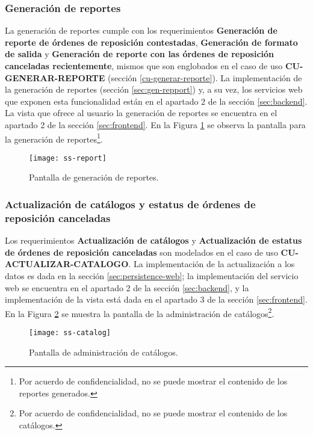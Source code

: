 \subsubsection{Generación de reportes}
La generación de reportes cumple con los requerimientos \textbf{Generación de reporte de órdenes de reposición contestadas}, \textbf{Generación de formato de salida} y \textbf{Generación de reporte con las órdenes de reposición canceladas recientemente}, mismos que son englobados en el caso de uso \textbf{CU-GENERAR-REPORTE} (sección \ref{cu-generar-reporte}). La implementación de la generación de reportes (sección \ref{sec:gen-repport}) y, a su vez, los servicios web que exponen esta funcionalidad están en el apartado 2 de la sección \ref{sec:backend}. La vista que ofrece al usuario la generación de reportes se encuentra en el apartado 2 de la sección \ref{sec:frontend}. En la Figura \ref{fig:ss-report} se observa la pantalla para la generación de reportes\footnote{Por acuerdo de confidencialidad, no se puede mostrar el contenido de los reportes generados.}. 
	\begin{figure}[h]
		\centering
		\texttt{[image: ss-report]}
		\caption{Pantalla de generación de reportes.}
		\label{fig:ss-report}
	\end{figure}
\subsubsection{Actualización de catálogos y estatus de órdenes de reposición canceladas}
Los requerimientos \textbf{Actualización de catálogos} y \textbf{Actualización de estatus de órdenes de reposición canceladas} son modelados en el caso de uso \textbf{CU-ACTUALIZAR-CATALOGO}. La implementación de la actualización a los datos es dada en la sección \ref{sec:persistence-web}; la implementación del servicio web se encuentra en el apartado 2 de la sección \ref{sec:backend}, y la implementación de la vista está dada en el apartado 3 de la sección \ref{sec:frontend}. En la Figura \ref{fig:ss-catalog} se muestra la pantalla de la administración de catálogos\footnote{Por acuerdo de confidencialidad, no se puede mostrar el contenido de los catálogos.}.
\begin{figure}[h]
	\centering
	\texttt{[image: ss-catalog]}
	\caption{Pantalla de administración de catálogos.}
	\label{fig:ss-catalog}
\end{figure}
